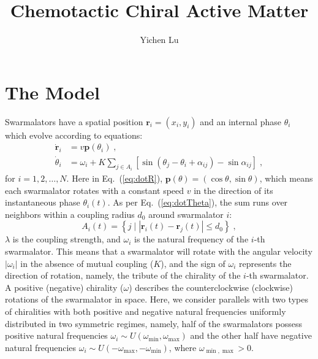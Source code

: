 \documentclass{article}
\title{\textbf{Chemotactic Chiral Active Matter}}
\author{Yichen Lu}
\begin{document}
\maketitle

\tableofcontents

\newpage
\section{\label{sec:model}The Model}

Swarmalators have a spatial position $\mathbf{r}_i=\left( x_i, y_i \right)$ and an internal phase $\theta_i$ which evolve according to equations:
\begin{subequations}
    \label{eq:totalDynamics}
    \begin{align}
        \dot{\mathbf{r}}_i&=v\mathbf{p}\left( \theta _i \right)\label{eq:dotR}\;,\\
        \dot{\theta}_i&=\omega _i+K\sum_{j\in A_i}{\left[ \sin \left( \theta _j-\theta _i+\alpha _{ij} \right) -\sin \alpha _{ij} \right]}\label{eq:dotTheta}\;,
    \end{align}
\end{subequations}
for $i=1,2,\ldots,N$. Here in Eq.~(\ref{eq:dotR}), $\mathbf{p}\left( \theta \right) =\left( \cos \theta ,\sin \theta \right)$, which means each swarmalator rotates with a constant speed $v$ in the direction of its instantaneous phase $\theta_i (t)$. As per Eq.~(\ref{eq:dotTheta}), the sum runs over neighbors within a coupling radius $d_0$ around swarmalator $i$:
\begin{equation}
    A_i\left( t \right) =\left\{ j\mid \left| \mathbf{r}_i\left( t \right) -\mathbf{r}_j\left( t \right) \right|\leqslant d_0 \right\} \;,
\end{equation}
$\lambda$ is the coupling strength, and $\omega_i$ is the natural frequency of the $i$-th swarmalator. This means that a swarmalator will rotate with the angular velocity $|\omega_i |$ in the absence of mutual coupling ($K$), and the sign of $\omega_i$ represents the direction of rotation, namely, the tribute of the chirality of the $i$-th swarmalator. A positive (negative) chirality ($\omega$) describes the counterclockwise (clockwise) rotations of the swarmalator in space. Here, we consider parallels with two types of chiralities with both positive and negative natural frequencies uniformly distributed in two symmetric regimes, namely, half of the swarmalators possess positive natural frequencies $\omega_i \sim U\left( \omega _{\min},\omega _{\max} \right)$ and the other half have negative natural frequencies $\omega_i \sim U\left( -\omega _{\max},-\omega _{\min} \right)$, where $\omega _{\min, \max}>0$.
\end{document}

